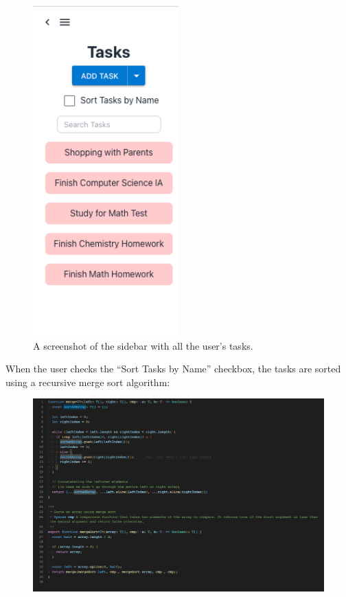 \documentclass[notitlepage, 12pt]{report}
\begin{document}
\begin{figure}[H]
	\centering
	\caption{A screenshot of the sidebar with all the user's tasks.}
	\includegraphics[width=0.5\textwidth]{sidebar.png}
\end{figure}

\newpage

When the user checks the ``Sort Tasks by Name'' checkbox, the tasks are sorted using a recursive merge sort algorithm:

\begin{figure}[H]
	\includegraphics[width=\textwidth]{merge-sort.png}
\end{figure}
\end{document}
